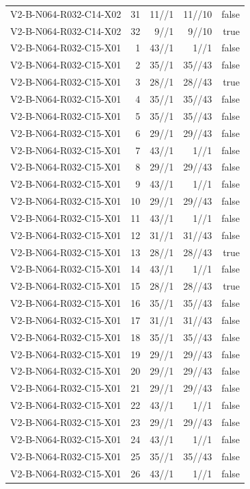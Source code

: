 {\begin{longtable}{lrrrr}
V2-B-N064-R032-C14-X02 & 31 & 11//1 & 11//10 & false \\
V2-B-N064-R032-C14-X02 & 32 & 9//1 & 9//10 & true \\
V2-B-N064-R032-C15-X01 & 1 & 43//1 & 1//1 & false \\
V2-B-N064-R032-C15-X01 & 2 & 35//1 & 35//43 & false \\
V2-B-N064-R032-C15-X01 & 3 & 28//1 & 28//43 & true \\
V2-B-N064-R032-C15-X01 & 4 & 35//1 & 35//43 & false \\
V2-B-N064-R032-C15-X01 & 5 & 35//1 & 35//43 & false \\
V2-B-N064-R032-C15-X01 & 6 & 29//1 & 29//43 & false \\
V2-B-N064-R032-C15-X01 & 7 & 43//1 & 1//1 & false \\
V2-B-N064-R032-C15-X01 & 8 & 29//1 & 29//43 & false \\
V2-B-N064-R032-C15-X01 & 9 & 43//1 & 1//1 & false \\
V2-B-N064-R032-C15-X01 & 10 & 29//1 & 29//43 & false \\
V2-B-N064-R032-C15-X01 & 11 & 43//1 & 1//1 & false \\
V2-B-N064-R032-C15-X01 & 12 & 31//1 & 31//43 & false \\
V2-B-N064-R032-C15-X01 & 13 & 28//1 & 28//43 & true \\
V2-B-N064-R032-C15-X01 & 14 & 43//1 & 1//1 & false \\
V2-B-N064-R032-C15-X01 & 15 & 28//1 & 28//43 & true \\
V2-B-N064-R032-C15-X01 & 16 & 35//1 & 35//43 & false \\
V2-B-N064-R032-C15-X01 & 17 & 31//1 & 31//43 & false \\
V2-B-N064-R032-C15-X01 & 18 & 35//1 & 35//43 & false \\
V2-B-N064-R032-C15-X01 & 19 & 29//1 & 29//43 & false \\
V2-B-N064-R032-C15-X01 & 20 & 29//1 & 29//43 & false \\
V2-B-N064-R032-C15-X01 & 21 & 29//1 & 29//43 & false \\
V2-B-N064-R032-C15-X01 & 22 & 43//1 & 1//1 & false \\
V2-B-N064-R032-C15-X01 & 23 & 29//1 & 29//43 & false \\
V2-B-N064-R032-C15-X01 & 24 & 43//1 & 1//1 & false \\
V2-B-N064-R032-C15-X01 & 25 & 35//1 & 35//43 & false \\
V2-B-N064-R032-C15-X01 & 26 & 43//1 & 1//1 & false \\

\end{longtable}}
